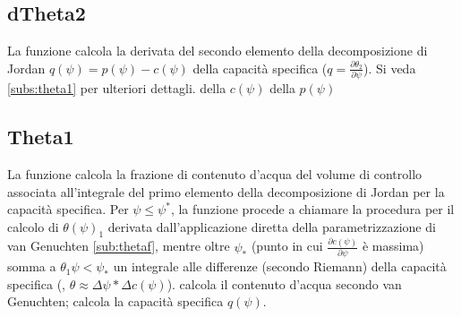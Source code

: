 \documentclass[
10pt, %
a4paper, %
oneside, %
headinclude,footinclude, %
BCOR5mm, %
]{scrartcl}
\begin{document}
	\subsection{dTheta2}
		La funzione calcola la derivata del secondo elemento della decomposizione di Jordan $q(\psi) = p(\psi) - c(\psi)$ della capacità specifica ($q=\frac{\partial \theta_{2}}{\partial \psi}$).
		Si veda \ref{subs:theta1} per ulteriori dettagli.
		\subroutines
			della $c(\psi)$
			\newline
			della $p(\psi)$
	\subsection{Theta1}
	\label{sub:theta1}
		La funzione calcola la frazione di contenuto d'acqua del volume di controllo associata all'integrale 
		del primo elemento della decomposizione di Jordan per la capacità specifica. Per $\psi\leq\psi^{*}$, la funzione
		procede a chiamare la procedura per il calcolo di $\theta(\psi)_{1}$ derivata dall'applicazione diretta della
		parametrizzazione di van Genuchten \ref{sub:thetaf}, mentre oltre $\psi_{*}$ (punto in cui $\frac{\partial c(\psi)}{\partial \psi}$ è massima) somma a $\theta_1{\psi<\psi_{*}}$ un integrale alle differenze (secondo Riemann) della capacità specifica 
		(, $\theta\approx\Delta\psi*\Delta c(\psi)$).  
		\subroutines
			calcola il contenuto d'acqua secondo van Genuchten;
			calcola la capacità specifica $q(\psi)$.

\end{document}
